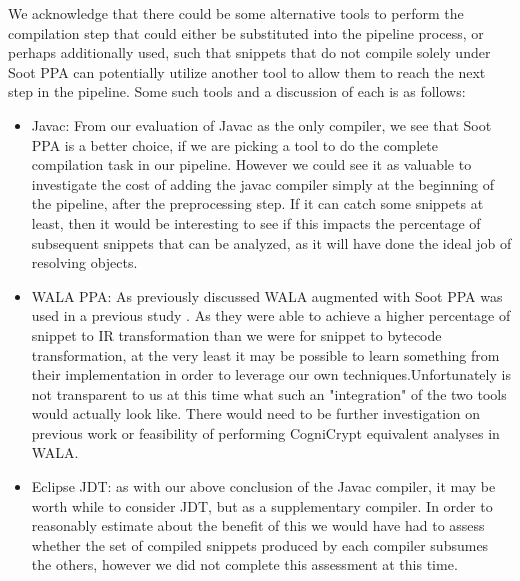 \documentclass[10pt, conference]{IEEEtran}
\begin{document}
We acknowledge that there could be some alternative tools to perform the compilation step that could either be substituted into the pipeline process, or perhaps additionally used, such that snippets that do not compile solely under Soot PPA can potentially utilize another tool to allow them to reach the next step in the pipeline. Some such tools and a discussion of each is as follows:
\begin{itemize}
\item
Javac: From our evaluation of Javac as the only compiler, we see that Soot PPA is a better choice, if we are picking a tool to do the complete compilation task in our pipeline. However we could see it as valuable to investigate the cost of adding the javac compiler simply at the beginning of the pipeline, after the preprocessing step. If it can catch some snippets at least, then it would be interesting to see if this impacts the percentage of subsequent snippets that can be analyzed, as it will have done the ideal job of resolving objects.
\item
WALA PPA: As previously discussed WALA augmented with Soot PPA was used in a previous study \cite{7958574}. As they were able to achieve a higher percentage of snippet to IR transformation than we were for snippet to bytecode transformation, at the very least it may be possible to learn something from their implementation in order to leverage our own techniques.Unfortunately is not transparent to us at this time what such an "integration" of the two tools would actually look like. There would need to be further investigation on previous work or feasibility of performing CogniCrypt equivalent analyses in WALA.

\item
Eclipse JDT: as with our above conclusion of the Javac compiler, it may be worth while to consider JDT, but as a supplementary compiler.
In order to reasonably estimate about the benefit of this we would have had to assess whether the set of compiled snippets produced by each compiler subsumes the others, however we did not complete this assessment at this time.

\end{itemize}
\end{document}
